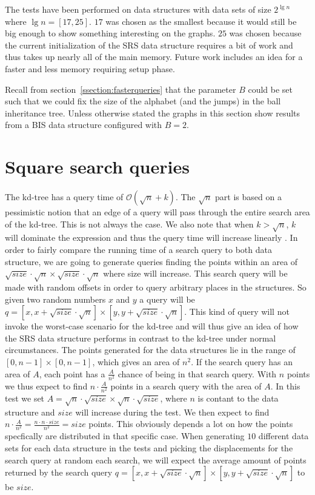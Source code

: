 The tests have been performed on data structures with data sets of size $2^{\lg n}$ where $\lg n = [17,25]$. $17$ was chosen as the smallest because it would still be big enough to show something interesting on the graphs. $25$ was chosen because the current initialization of the SRS data structure requires a bit of work and thus takes up nearly all of the main memory. Future work includes an idea for a faster and less memory requiring setup phase.

Recall from section~\ref{ssection:fasterqueries} that the parameter $B$ could be set such that we could fix the size of the alphabet (and the jumps) in the ball inheritance tree. Unless otherwise stated the graphs in this section show results from a BIS data structure configured with $B=2$. 




\section{Square search queries}
\label{sect:squares}

The kd-tree has a query time of $\mathcal{O}(\sqrt{n}+k)$. The $\sqrt{n}$ part is based on a pessimistic notion that an edge of a query will pass through the entire search area of the kd-tree. This is not always the case. We also note that when $k > \sqrt{n}$, $k$ will dominate the expression and thus the query time will increase linearly . In order to fairly compare the running time of a search query to both data structure, we are going to generate queries finding the points within an area of $\sqrt{size}\cdot\sqrt{n} \times \sqrt{size}\cdot\sqrt{n}$ where size will increase. This search query will be made with random offsets in order to query arbitrary places in the structures. So given two random numbers $x$ and $y$ a query will be $q = [x, x+\sqrt{size}\cdot\sqrt{n}] \times [y, y+\sqrt{size}\cdot\sqrt{n}]$. This kind of query will not invoke the worst-case scenario for the kd-tree and will thus give an idea of how the SRS data structure performs in contrast to the kd-tree under normal circumstances. The points generated for the data structures lie in the range of $[0,n-1] \times [0,n-1]$, which gives an area of $n^2$. If the search query has an area of $A$, each point has a $\frac{A}{n^2}$ chance of being in that search query. With $n$ points we thus expect to find $n\cdot \frac{A}{n^2}$ points in a search query with the area of $A$. In this test we set $A = \sqrt{n}\cdot\sqrt{size}\times\sqrt{n}\cdot\sqrt{size}$, where $n$ is contant to the data structure and $size$ will increase during the test. We then expect to find $n\cdot\frac{A}{n^2} = \frac{n\cdot n \cdot size}{n^2} = size$ points. This obviously depends a lot on how the points specfically are distributed in that specific case. When generating $10$ different data sets for each data structure in the tests and picking the displacements for the search query at random each search, we will expect the average amount of points returned by the search query $q = [x, x+\sqrt{size}\cdot\sqrt{n}] \times [y, y+\sqrt{size}\cdot\sqrt{n}]$ to be $size$.

